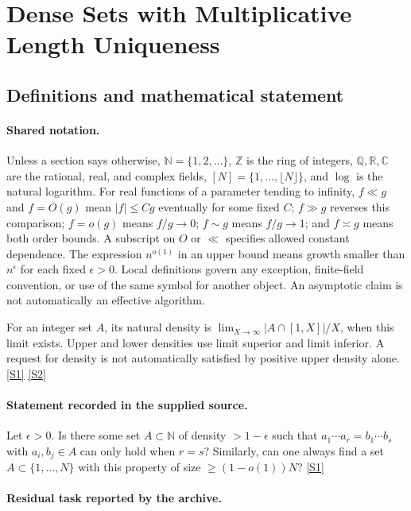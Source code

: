 \documentclass[11pt,a4paper]{article}
\newcommand{\N}{\mathbb{N}}
\newcommand{\Z}{\mathbb{Z}}
\newcommand{\Q}{\mathbb{Q}}
\newcommand{\R}{\mathbb{R}}
\newcommand{\C}{\mathbb{C}}
\newcommand{\sref}[2]{\hyperlink{source:#1:#2}{[S#2]}}
\begin{document}
\section{Dense Sets with Multiplicative Length Uniqueness}\label{statement}


\subsection{Definitions and mathematical statement}

\paragraph{Shared notation.}Unless a section says otherwise, $\N=\{1,2,\ldots\}$,
$\Z$ is the ring of integers, $\Q,\R,\C$ are the rational, real, and complex
fields, $[N]=\{1,\ldots,\lfloor N\rfloor\}$, and $\log$ is the natural
logarithm. For real functions of a parameter tending to infinity,
$f\ll g$ and $f=O(g)$ mean $|f|\leq Cg$ eventually for some fixed $C$;
$f\gg g$ reverses this comparison; $f=o(g)$ means $f/g\to0$;
$f\sim g$ means $f/g\to1$; and $f\asymp g$ means both order bounds.
A subscript on $O$ or $\ll$ specifies allowed constant dependence.
The expression $n^{o(1)}$ in an upper bound means growth smaller than
$n^\epsilon$ for each fixed $\epsilon>0$. Local definitions govern any
exception, finite-field convention, or use of the same symbol for another
object. An asymptotic claim is not automatically an effective algorithm.



For an integer set $A$, its natural density is $\lim_{X\to\infty}|A\cap[1,X]|/X$, when this limit exists. Upper and lower densities use limit superior and limit inferior. A request for density is not automatically satisfied by positive upper density alone. \sref{statement}{1} \sref{statement}{2}

\paragraph{Statement recorded in the supplied source.}
Let $\epsilon>0$. Is there some set $A\subset \mathbb{N}$ of density $>1-\epsilon$ such that $a_1\cdots a_r=b_1\cdots b_s$ with $a_i,b_j\in A$ can only hold when $r=s$?
Similarly, can one always find a set $A\subset\{1,\ldots,N\}$ with this property of size $\geq (1-o(1))N$? \sref{statement}{1}

\paragraph{Residual task reported by the archive.}
\end{document}
